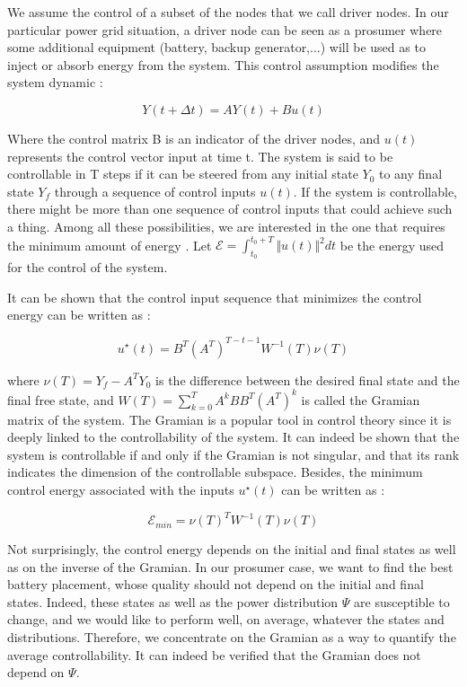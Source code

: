 \documentclass[conference]{IEEEtran}
\begin{document}
We assume the control of a subset of the nodes that we call driver nodes. In our particular power grid situation, a driver node can be seen as a prosumer where some additional equipment (battery, backup generator,...) will be used as to inject or absorb energy from the system. This control assumption modifies the system dynamic :


\begin{equation}
 Y(t+\Delta t) = A Y(t) + B u(t) 
\end{equation}


Where the control matrix B is an indicator of the driver nodes, and $ u(t) $ represents the control vector input at time t. The system is said to be controllable in T steps if it can be steered from any initial state $ Y_0 $ to any final state $ Y_f $ through a sequence of control inputs $ u(t) $. If the system is controllable, there might be more than one sequence of control inputs that could achieve such a thing. Among all these possibilities, we are interested in the one that requires the minimum amount of energy \cite{Yan2012}. Let $ \mathcal{E} = \int_{t_0}^{t_0+T} \Vert u(t) \Vert^2 dt $ be the energy used for the control of the system.

It can be shown \cite{Liu2015} that the control input sequence that minimizes the control energy can be written as :


\begin{equation}
 u^{\star}(t) = B^T(A^T)^{T-t-1}W^{-1}(T)\nu(T)
\end{equation}


where $ \nu(T) = Y_f - A^T Y_0 $ is the difference between the desired final state and the final free state, and $W(T) = \sum_{k=0}^{T} A^k B B^T (A^T)^k $ is called the Gramian matrix of the system. The Gramian is a popular tool in control theory since it is deeply linked to the controllability of the system. It can indeed be shown that the system is controllable if and only if the Gramian is not singular, and that its rank indicates the dimension of the controllable subspace. Besides, the minimum control energy associated with the inputs $ u^{\star}(t)$ can be written as :


\begin{equation}
 \mathcal{E}_{min} = \nu(T)^T W^{-1}(T) \nu(T)
\end{equation}


Not surprisingly, the control energy depends on the initial and final states as well as on the inverse of the Gramian. In our prosumer case, we want to find the best battery placement, whose quality should not depend on the initial and final states. Indeed, these states as well as  the power  distribution $ \Psi $ are susceptible to change, and we would like to perform well, on average, whatever the states and distributions. Therefore, we concentrate on  the Gramian as a way to quantify the average controllability. It can indeed be verified that the Gramian does not depend on $\Psi$.
\end{document}
